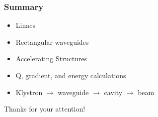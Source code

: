 \documentclass[professionalfonts,t]{beamer}
\begin{document}
\begin{frame}
	\frametitle{Summary}
	\begin{itemize}
		\item Linacs
		\item Rectangular waveguides
		\item Accelerating Structures
		\item Q, gradient, and energy calculations
		\item Klystron $\rightarrow$ waveguide $\rightarrow$ cavity $\rightarrow$ beam
	\end{itemize}

\vspace{1em}

	\centering
	\large{Thanks for your attention!}
\end{frame}
\fi
\end{document}
